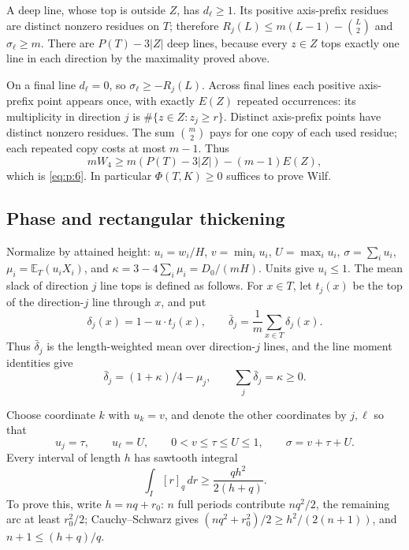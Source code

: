 A deep line, whose top is outside \(Z\), has \(d_\ell\ge1\).
Its positive axis-prefix residues are distinct nonzero residues on \(T\);
therefore \(R_j(L)\le m(L-1)-\binom L2\) and \(\sigma_\ell\ge m\).
There are \(P(T)-3|Z|\) deep lines, because every \(z\in Z\) tops exactly
one line in each direction by the maximality proved above.

On a final line \(d_\ell=0\), so \(\sigma_\ell\ge-R_j(L)\).
Across final lines each positive axis-prefix point appears once, with
exactly \(E(Z)\) repeated occurrences: its multiplicity in direction \(j\)
is \(\#\{z\in Z:z_j\ge r\}\).
Distinct axis-prefix points have distinct nonzero residues.
The sum \(\binom m2\) pays for one copy of each used residue;
each repeated copy costs at most \(m-1\).
Thus
\[
mW_4\ge m(P(T)-3|Z|)-(m-1)E(Z),
\]
which is \eqref{eq:p:6}.
In particular \(\Phi(T,K)\ge0\) suffices to prove Wilf.

\subsection{Phase and rectangular thickening}\label{sec:p4}

Normalize by attained height: \(u_i=w_i/H\), \(v=\min_i u_i\),
\(U=\max_i u_i\), \(\sigma=\sum_i u_i\),
\(\mu_i=\mathbb E_T(u_iX_i)\), and
\(\kappa=3-4\sum_i\mu_i=D_0/(mH)\).
Units give \(u_i\le1\). The mean slack of direction \(j\) line tops is
defined as follows. For \(x\in T\), let \(t_j(x)\) be the top of the
direction-\(j\) line through \(x\), and put
\[
\delta_j(x)=1-u\cdot t_j(x),\qquad
\bar\delta_j=\frac1m\sum_{x\in T}\delta_j(x).
\]
Thus \(\bar\delta_j\) is the length-weighted mean over direction-\(j\)
lines, and the line moment identities give
\[
\bar\delta_j=(1+\kappa)/4-\mu_j,\qquad
\sum_j\bar\delta_j=\kappa\ge0.
\]

Choose coordinate \(k\) with \(u_k=v\), and denote the other coordinates
by \(j,\ell\) so that
\[
u_j=\tau,\qquad u_\ell=U,\qquad
0<v\le\tau\le U\le1,\qquad \sigma=v+\tau+U.
\]
Every interval of length \(h\) has sawtooth integral
\[
\int_I[r]_q\,dr\ge\frac{qh^2}{2(h+q)}.
\]
To prove this, write \(h=nq+r_0\): \(n\) full periods contribute
\(nq^2/2\), the remaining arc at least \(r_0^2/2\);
Cauchy--Schwarz gives \((nq^2+r_0^2)/2\ge h^2/(2(n+1))\),
and \(n+1\le(h+q)/q\).

